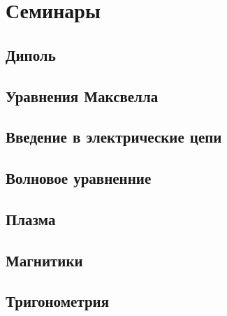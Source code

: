 
% 




\newpage


\newpage
\section{Семинары}

\subsection{Диполь}


\subsection{Уравнения Максвелла}


\subsection{Введение в электрические цепи}



\subsection{Волновое уравненние}


\subsection{Плазма}


\subsection{Магнитики}


\subsection{Тригонометрия}


